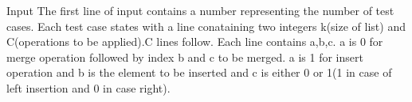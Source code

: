 Input
The first line of input contains a number representing the number of test cases. Each test case states with a line conataining two integers k(size of list) and C(operations to be applied).C lines follow. Each line contains a,b,c. a is 0 for merge operation followed by index b and c to be merged. a is 1 for insert operation and b is the element to be inserted and c is either 0 or 1(1 in case of left insertion and 0 in case right).